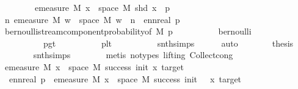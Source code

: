 \begin{isabellebody}
\ \ \isamarkupfalse%
\isanewline
\ \ \isamarkupfalse%
\ \isamarkupfalse%
\ {\isachardoublequoteopen}emeasure\ M\ {\isacharbraceleft}{\kern0pt}x\ {\isasymin}\ space\ M{\isachardot}{\kern0pt}\ shd\ x{\isacharbraceright}{\kern0pt}\ {\isacharequal}{\kern0pt}\ p{\isachardoublequoteclose}\isanewline
\ \ \isamarkupfalse%
{\isacharminus}{\kern0pt}\isanewline
\ \ \ \ \isamarkupfalse%
\ {\isachardoublequoteopen}{\isasymforall}n{\isachardot}{\kern0pt}\ emeasure\ M\ {\isacharbraceleft}{\kern0pt}w\ {\isasymin}\ space\ M{\isachardot}{\kern0pt}\ w\ {\isacharbang}{\kern0pt}{\isacharbang}{\kern0pt}\ n{\isacharbraceright}{\kern0pt}\ {\isacharequal}{\kern0pt}\ ennreal\ p{\isachardoublequoteclose}\isanewline
\ \ \ \ \isamarkupfalse%
\ bernoulli{\isacharunderscore}{\kern0pt}stream{\isacharunderscore}{\kern0pt}component{\isacharunderscore}{\kern0pt}probability{\isacharbrackleft}{\kern0pt}of\ M\ p{\isacharbrackright}{\kern0pt}\isanewline
\ \ \ \ \ \ \ \ \ \ bernoulli\isanewline
\ \ \ \ \ \ \ \ \ \ p{\isacharunderscore}{\kern0pt}gt{\isacharunderscore}{\kern0pt}{}\isanewline
\ \ \ \ \ \ \ \ \ \ p{\isacharunderscore}{\kern0pt}lt{\isacharunderscore}{\kern0pt}{}\isanewline
\ \ \ \ \ \ \ \ \ \ snth{\isachardot}{\kern0pt}simps{\isacharparenleft}{\kern0pt}{}{\isacharparenright}{\kern0pt}\isanewline
\ \ \ \ \isamarkupfalse%
\ auto\isanewline
\ \ \ \ \isamarkupfalse%
\ \isamarkupfalse%
\ {\isacharquery}{\kern0pt}thesis\isanewline
\ \ \ \ \ \ \isamarkupfalse%
\ snth{\isachardot}{\kern0pt}simps{\isacharparenleft}{\kern0pt}{}{\isacharparenright}{\kern0pt}\isanewline
\ \ \ \ \ \ \isamarkupfalse%
\ {\isacharparenleft}{\kern0pt}metis\ {\isacharparenleft}{\kern0pt}no{\isacharunderscore}{\kern0pt}types{\isacharcomma}{\kern0pt}\ lifting{\isacharparenright}{\kern0pt}\ Collect{\isacharunderscore}{\kern0pt}cong{\isacharparenright}{\kern0pt}\isanewline
\ \ \isamarkupfalse%
\isanewline
\ \ \isamarkupfalse%
\ \isamarkupfalse%
\ {\isachardoublequoteopen}emeasure\ M\ {\isacharbraceleft}{\kern0pt}x\ {\isasymin}\ space\ M{\isachardot}{\kern0pt}\ success\ init\ x\ target{\isacharbraceright}{\kern0pt}\ {\isacharequal}{\kern0pt}\isanewline
\ \ ennreal\ p\ {\isacharasterisk}{\kern0pt}\ emeasure\ M\ {\isacharbraceleft}{\kern0pt}x\ {\isasymin}\ space\ M{\isachardot}{\kern0pt}\ success\ {\isacharparenleft}{\kern0pt}init\ {\isacharplus}{\kern0pt}\ {}{\isacharparenright}{\kern0pt}\ x\ target{\isacharbraceright}{\kern0pt}\ {\isacharplus}{\kern0pt}\isanewline

\end{isabellebody}
